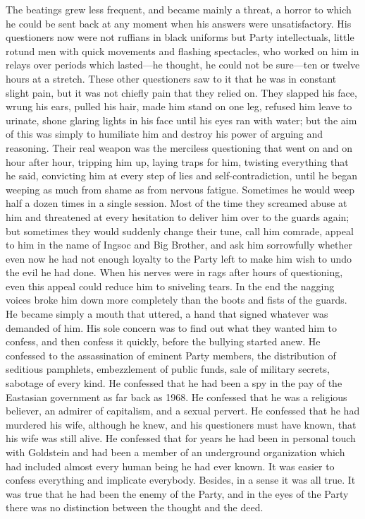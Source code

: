 The beatings grew less frequent, and became mainly a threat, a horror to
which he could be sent back at any moment when his answers were
unsatisfactory. His questioners now were not ruffians in black uniforms
but Party intellectuals, little rotund men with quick movements and
flashing spectacles, who worked on him in relays over periods which
lasted---he thought, he could not be sure---ten or twelve hours at a
stretch. These other questioners saw to it that he was in constant
slight pain, but it was not chiefly pain that they relied on. They
slapped his face, wrung his ears, pulled his hair, made him stand on one
leg, refused him leave to urinate, shone glaring lights in his face
until his eyes ran with water; but the aim of this was simply to
humiliate him and destroy his power of arguing and reasoning. Their real
weapon was the merciless questioning that went on and on hour after
hour, tripping him up, laying traps for him, twisting everything that he
said, convicting him at every step of lies and self-contradiction, until
he began weeping as much from shame as from nervous fatigue. Sometimes
he would weep half a dozen times in a single session. Most of the time
they screamed abuse at him and threatened at every hesitation to deliver
him over to the guards again; but sometimes they would suddenly change
their tune, call him comrade, appeal to him in the name of Ingsoc and
Big Brother, and ask him sorrowfully whether even now he had not enough
loyalty to the Party left to make him wish to undo the evil he had done.
When his nerves were in rags after hours of questioning, even this
appeal could reduce him to sniveling tears. In the end the nagging
voices broke him down more completely than the boots and fists of the
guards. He became simply a mouth that uttered, a hand that signed
whatever was demanded of him. His sole concern was to find out what they
wanted him to confess, and then confess it quickly, before the bullying
started anew. He confessed to the assassination of eminent Party
members, the distribution of seditious pamphlets, embezzlement of public
funds, sale of military secrets, sabotage of every kind. He confessed
that he had been a spy in the pay of the Eastasian government as far
back as 1968. He confessed that he was a religious believer, an admirer
of capitalism, and a sexual pervert. He confessed that he had murdered
his wife, although he knew, and his questioners must have known, that
his wife was still alive. He confessed that for years he had been in
personal touch with Goldstein and had been a member of an underground
organization which had included almost every human being he had ever
known. It was easier to confess everything and implicate everybody.
Besides, in a sense it was all true. It was true that he had been the
enemy of the Party, and in the eyes of the Party there was no
distinction between the thought and the deed.


